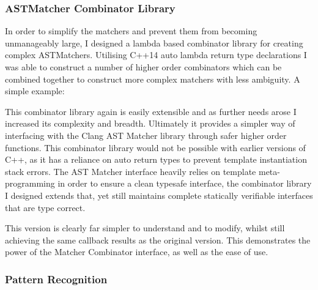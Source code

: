 \subsubsection{ASTMatcher Combinator Library}
In order to simplify the matchers and prevent them from becoming unmanageably large, I designed a
lambda based combinator library for creating complex ASTMatchers. Utilising C++14 auto lambda return type
declarations I was able to construct a number of higher order combinators which can be combined
together to construct more complex matchers with less ambiguity. A simple example:

This combinator library again is easily extensible and as further needs arose I increased its
complexity and breadth. Ultimately it provides a simpler way of interfacing with the Clang AST
Matcher library through safer higher order functions.
This combinator library would not be possible with earlier versions of C++, as it has a reliance on
auto return types to prevent template instantiation stack errors. The AST Matcher interface heavily
relies on template meta-programming in order to ensure a clean typesafe interface, the combinator
library I designed extends that, yet still maintains complete statically verifiable interfaces that
are type correct.

This version is clearly far simpler to understand and to modify, whilst still achieving the same
callback results as the original version. This demonstrates the power of the Matcher Combinator
interface, as well as the ease of use.

\subsubsection{Pattern Recognition}
